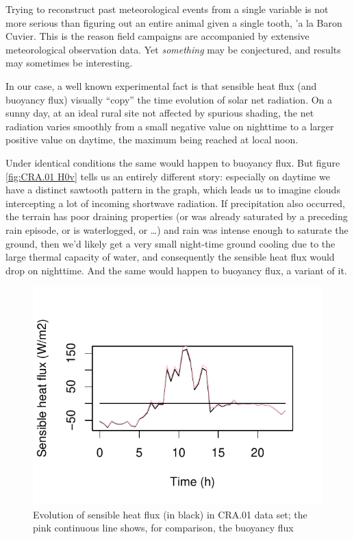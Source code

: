 \documentclass[a4paper,10pt]{book}
\begin{document}
Trying to reconstruct past meteorological events from a single variable is not more serious than figuring out an entire animal given a single tooth, 'a la Baron Cuvier. This is the reason field campaigns are accompanied by extensive meteorological observation data. Yet \emph{something} may be conjectured, and results may sometimes be interesting.

In our case, a well known experimental fact is that sensible heat flux (and buoyancy flux) visually ``copy'' the time evolution of solar net radiation. On a sunny day, at an ideal rural site not affected by spurious shading, the net radiation varies smoothly from a small negative value on nighttime to a larger positive value on daytime, the maximum being reached at local noon.

Under identical conditions the same would happen to buoyancy flux. But figure \ref{fig:CRA.01 H0v} tells us an entirely different story: especially on daytime we have a distinct sawtooth pattern in the graph, which leads us to imagine clouds intercepting a lot of incoming shortwave radiation. If precipitation also occurred, the terrain has poor draining properties (or was already saturated by a preceding rain episode, or is waterlogged, or \ldots) and rain was intense enough to saturate the ground, then we'd likely get a very small night-time ground cooling due to the large thermal capacity of water, and consequently the sensible heat flux would drop on nighttime. And the same would happen to buoyancy flux, a variant of it.

\begin{figure}[htp]
 \centering
 \begin{center}
 \includegraphics[scale=1.1,keepaspectratio=true]{./diagrams/CRA01_H0.pdf}
 \end{center}
 \caption{Evolution of sensible heat flux (in black) in CRA.01 data set; the pink continuous line shows, for comparison, the buoyancy flux}
 \label{fig:CRA.01 H0}
\end{figure}
\end{document}
